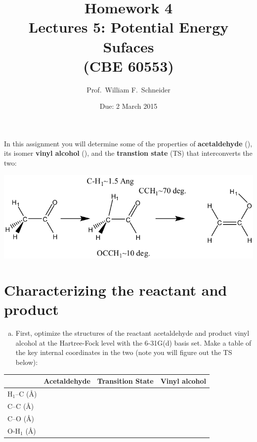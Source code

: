 \documentclass[11pt]{article}
\date{Due: 2 March 2015}
\title{}
\begin{document}
\title{Homework 4\\Lectures 5: Potential Energy Sufaces\\(CBE 60553)}
\author{Prof.\ William F.\ Schneider}
\maketitle

In this assignment you will determine some of the properties of \textbf{acetaldehyde} (), its isomer \textbf{vinyl alcohol} (), and the \textbf{transtion state} (TS) that interconverts the two:

\begin{center}
\includegraphics[width=.9\linewidth]{fig1.png}
\end{center}



\section{Characterizing the reactant and product}
\label{sec-1}

\begin{enumerate}[(a)]
\item First, optimize the structures of the reactant acetaldehyde and product vinyl alcohol at the Hartree-Fock level with the 6-31G(d) basis set. Make a table of the key internal coordinates in the two (note you will figure out the TS below):
\end{enumerate}

\begin{center}
\begin{tabular}{llll}
\hline
 & Acetaldehyde & Transition State & Vinyl alcohol\\
\hline
H$_{\text{1}}$–C (\AA{}) &  &  & \\
C–C (\AA{}) &  &  & \\
C–O (\AA{}) &  &  & \\
O-H$_{\text{1}}$ (\AA{}) &  &  & \\
\hline
\end{tabular}
\end{center}
\end{document}
